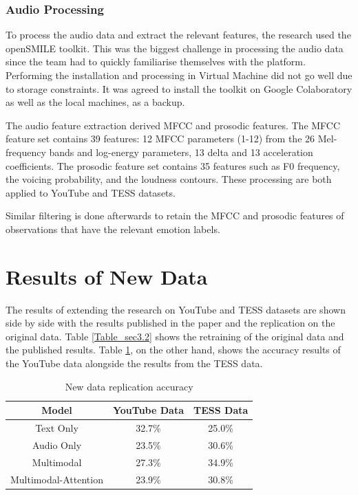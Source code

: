 \documentclass{article}
\newenvironment{subs}
  {\adjustwidth{3em}{0pt}}
  {\endadjustwidth}
\begin{document}
\begin{subs}
\subsubsection*{Audio Processing}
To process the audio data and extract the relevant features, the research used the openSMILE toolkit. This was the biggest challenge in processing the audio data since the team had to quickly familiarise themselves with the platform. Performing the installation and processing in Virtual Machine did not go well due to storage constraints. It was agreed to install the toolkit on Google Colaboratory as well as the local machines, as a backup.

The audio feature extraction derived MFCC and prosodic features. The MFCC feature set contains 39 features: 12 MFCC parameters (1-12) from the 26 Mel-frequency bands and log-energy parameters, 13 delta and 13 acceleration coefficients. The prosodic feature set contains 35 features such as F0 frequency, the voicing probability, and the loudness contours. These processing are both applied to YouTube and TESS datasets.

Similar filtering is done afterwards to retain the MFCC and prosodic features of observations that have the relevant emotion labels.
\end{subs}

\section{Results of New Data}
    The results of extending the research on YouTube and TESS datasets are shown side by side with the results published in the paper and the replication on the original data. Table \ref{Table_sec3.2} shows the retraining of the original data and the published results.  Table \ref{Table_sec5}, on the other hand, shows the accuracy results of the YouTube data alongside the results from the TESS data.
    
    \begin{table}[H]
        \centering
        \begin{tabular}{|   c   c   c |}
        \hline
        Model & YouTube Data & TESS Data \\
        \hline
        Text Only & 32.7\% & 25.0\% \\
        Audio Only & 23.5\% & 30.6\% \\
        Multimodal & 27.3\% & 34.9\% \\
        Multimodal-Attention & 23.9\% & 30.8\%\\
        \hline
        \end{tabular}
        \caption{New data replication accuracy}
        \label{Table_sec5}
    \end{table}
    
\end{document}
